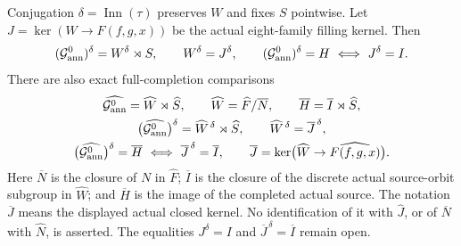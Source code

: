 Conjugation $\delta=\operatorname{Inn}(\tau)$ preserves $W$ and
fixes $S$ pointwise. Let $J=\ker(W\to F(f,g,x))$ be the actual
eight-family filling kernel. Then
\begin{equation}\label{eq:B123-discrete-gate}
 (\mathcal G^0_{\rm ann})^\delta=W^\delta\rtimes S,
 \qquad W^\delta=J^\delta,\qquad
 (\mathcal G^0_{\rm ann})^\delta=H
       \ \Longleftrightarrow\ J^\delta=I.
\end{equation}
There are also exact full-completion comparisons
\begin{equation}\label{eq:B123-compact-gate}
 \begin{gathered}
 \widehat{\mathcal G^0_{\rm ann}}=\widehat W\rtimes\widehat S,
 \qquad \widehat W=\widehat F/\overline N,\qquad
 \overline H=\overline I\rtimes\widehat S,\\
 \bigl(\widehat{\mathcal G^0_{\rm ann}}\bigr)^\delta
       =\widehat W^{\,\delta}\rtimes\widehat S,
 \qquad \widehat W^{\,\delta}=\overline J^{\,\delta},\\
 \bigl(\widehat{\mathcal G^0_{\rm ann}}\bigr)^\delta=\overline H
       \ \Longleftrightarrow\ \overline J^{\,\delta}=\overline I,
 \qquad
 \overline J=\ker\bigl(\widehat W\to\widehat{F(f,g,x)}\bigr).
 \end{gathered}
\end{equation}
Here $\overline N$ is the closure of $N$ in $\widehat F$;
$\overline I$ is the closure of the discrete actual source-orbit
subgroup in $\widehat W$; and $\overline H$ is the image of the
completed actual source. The notation $\overline J$ means the
displayed actual closed kernel. No identification of it with
$\widehat J$, or of $\overline N$ with $\widehat N$, is asserted.
The equalities $J^\delta=I$ and
$\overline J^{\,\delta}=\overline I$ remain open.

